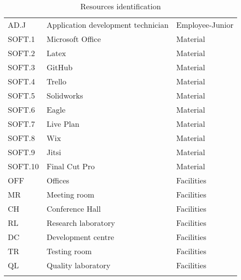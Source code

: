 \begin{longtable}{lll}
AD.J&Application development technician&Employee-Junior\\
SOFT.1&Microsoft Office&Material\\
SOFT.2&Latex&Material\\
SOFT.3&GitHub&Material\\
SOFT.4&Trello&Material\\
SOFT.5&Solidworks&Material\\
SOFT.6&Eagle&Material\\
SOFT.7&Live Plan&Material\\
SOFT.8&Wix&Material\\
SOFT.9&Jitsi&Material\\
SOFT.10&Final Cut Pro&Material\\
OFF& Offices & Facilities\\
MR& Meeting room& Facilities\\
CH& Conference Hall& Facilities\\
RL & Research laboratory & Facilities\\
DC & Development centre & Facilities\\
TR& Testing room & Facilities\\
QL& Quality laboratory& Facilities\\


\bottomrule[2pt]

\caption{Resources identification}
\label{table_resourcesidentification}	
\end{longtable}

